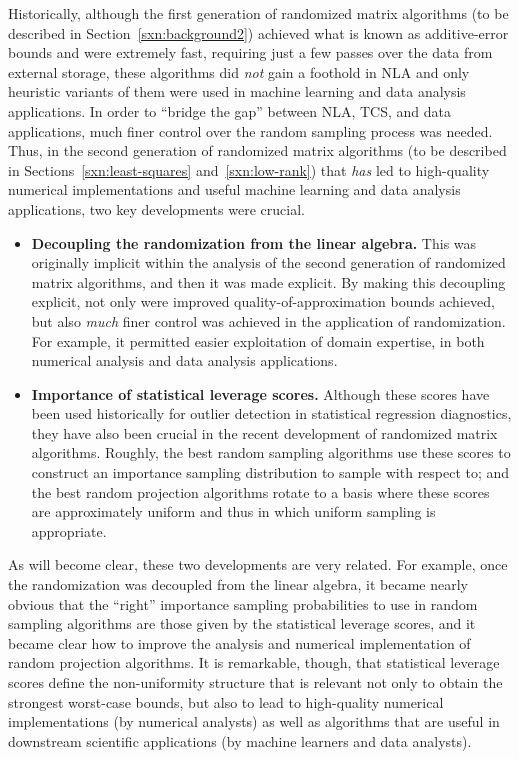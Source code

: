 \documentclass[twoside]{article}
\begin{document}
Historically, although the first generation of randomized matrix algorithms 
(to be described in Section~\ref{sxn:background2})
achieved what is known as additive-error bounds and were extremely fast, 
requiring just a few passes over the data from external storage, these 
algorithms did \emph{not} gain a foothold in NLA and only heuristic variants 
of them were used in machine learning and data analysis applications.
In order to ``bridge the gap'' between NLA, TCS, and data applications, 
much finer control over the random sampling process was needed.
Thus, in the second generation of randomized matrix algorithms 
(to be described in Sections~\ref{sxn:least-squares} and~\ref{sxn:low-rank})
that \emph{has} led to high-quality numerical implementations and useful 
machine learning and data analysis applications, two key developments were 
crucial.
\begin{itemize}
\item
\textbf{Decoupling the randomization from the linear algebra.}
This was originally implicit within the analysis of the second generation 
of randomized matrix algorithms, and then it was made explicit.
By making this decoupling explicit, not only were improved quality-of-approximation 
bounds achieved, but also \emph{much} finer control was achieved in the 
application of randomization.
For example, it permitted easier exploitation of domain expertise, in both 
numerical analysis and data analysis applications.
\item
\textbf{Importance of statistical leverage scores.}
Although these scores have been used historically for outlier detection in 
statistical regression diagnostics, they have also been crucial in the 
recent development of randomized matrix algorithms.
Roughly, the best random sampling algorithms use these scores to construct 
an importance sampling distribution to sample with respect to; and 
the best random projection algorithms rotate to a basis where these scores 
are approximately uniform and thus in which uniform sampling is 
appropriate.
\end{itemize}
As will become clear, these two developments are very related.
For example,
once the randomization was decoupled from the linear algebra, it became 
nearly obvious that the ``right'' importance sampling probabilities to use 
in random sampling algorithms are those given by the statistical leverage 
scores, and it became clear how to improve the analysis and numerical implementation of random 
projection algorithms.
It is remarkable, though, that statistical leverage scores define the
non-uniformity structure that is relevant not only to obtain the 
strongest worst-case bounds, but also to lead to high-quality numerical 
implementations (by numerical analysts) as well as algorithms that are 
useful in downstream scientific applications (by machine learners and data 
analysts).
\end{document}
